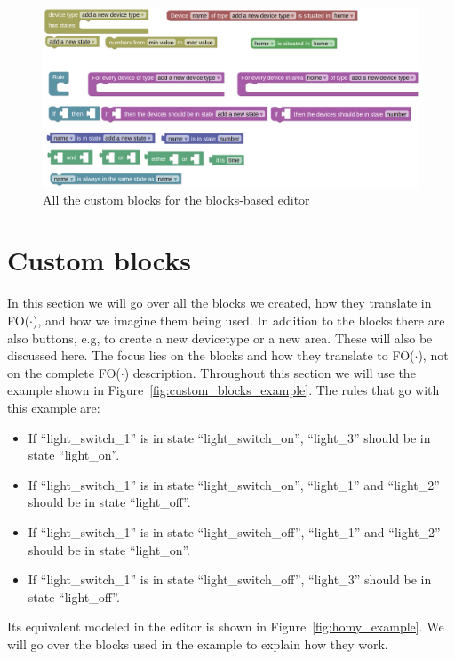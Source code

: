 \documentclass[11pt,a4paper]{report}
\newcommand{\fodot}{FO($\cdot$)\xspace}
\begin{document}
\begin{figure}
    \centering
    \includegraphics[width=1\linewidth]{images/homy.png}
    \caption{All the custom blocks for the blocks-based editor}
    \label{fig:homy}
\end{figure}

\section{Custom blocks}
\label{custom_blocks}
In this section we will go over all the blocks we created, how they translate in \fodot, and how we imagine them being used. In addition to the blocks there are also buttons, e.g, to create a new devicetype or a new area. These will also be discussed here. The focus lies on the blocks and how they translate to \fodot, not on the complete \fodot description. Throughout this section we will use the example shown in Figure~\ref{fig:custom_blocks_example}. The rules that go with this example are:
\begin{itemize}
    \item If ``light\_switch\_1'' is in state ``light\_switch\_on'', ``light\_3'' should be in state ``light\_on''.
    \item If ``light\_switch\_1'' is in state ``light\_switch\_on'', ``light\_1'' and ``light\_2'' should be in state ``light\_off''.
    \item If ``light\_switch\_1'' is in state ``light\_switch\_off'', ``light\_1'' and ``light\_2'' should be in state ``light\_on''.
    \item If ``light\_switch\_1'' is in state ``light\_switch\_off'', ``light\_3'' should be in state ``light\_off''.
\end{itemize}
Its equivalent modeled in the editor is shown in Figure~\ref{fig:homy_example}. We will go over the blocks used in the example to explain how they work. 
\end{document}
